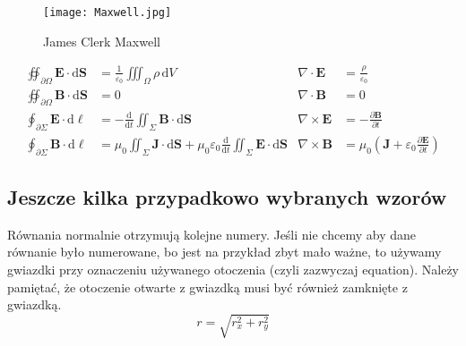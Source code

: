\begin{figure}[!t]
	\centering \texttt{[image: Maxwell.jpg]}
	\caption{James Clerk Maxwell}
	\label{rys:maxwell}
\end{figure}

\begin{align}
	\oiint\nolimits_{\partial \Omega} \pmb{E} \cdot \mathrm{d}\pmb{S}          & = \frac{1}{\varepsilon_0} \iiint\nolimits_\Omega \rho \, \mathrm{d}V                                                                                                         & \nabla \cdot \pmb{E}  & = \frac {\rho} {\varepsilon_0} \label{eq:maxwell1}                                                    \\
	\oiint\nolimits_{\partial \Omega} \pmb{B} \cdot \mathrm{d}\pmb{S}          & = 0                                                                                                                                                                          & \nabla \cdot \pmb{B}  & = 0 \label{eq:maxwell2}                                                                               \\
	\oint\nolimits_{\partial \Sigma} \pmb{E} \cdot \mathrm{d}\boldsymbol{\ell} & = -\frac{\mathrm{d}}{\mathrm{d}t}\iint\nolimits_{\Sigma}\pmb{B}\cdot\mathrm{d}\pmb{S}                                                                                        & \nabla \times \pmb{E} & = -\frac{\partial \pmb{B}}{\partial t} \label{eq:maxwell3}                                            \\
	\oint\nolimits_{\partial \Sigma} \pmb{B} \cdot \mathrm{d}\boldsymbol{\ell} & = \mu_0 \iint\nolimits_{\Sigma} \pmb{J} \cdot \mathrm{d}\pmb{S} + \mu_0 \varepsilon_0 \frac{\mathrm{d}}{\mathrm{d}t} \iint\nolimits_{\Sigma} \pmb{E} \cdot \mathrm{d}\pmb{S} & \nabla \times \pmb{B} & = \mu_0\left(\pmb{J} + \varepsilon_0 \frac{\partial \pmb{E}} {\partial t} \right) \label{eq:maxwell4}
\end{align}


\subsection{Jeszcze kilka przypadkowo wybranych wzorów}
Równania normalnie otrzymują kolejne numery. Jeśli nie chcemy aby dane równanie było numerowane, bo jest na przykład zbyt mało ważne, to używamy gwiazdki przy oznaczeniu używanego otoczenia (czyli zazwyczaj equation). Należy pamiętać, że otoczenie otwarte z gwiazdką musi być również zamknięte z gwiazdką.
\begin{equation*}
	r = \sqrt{r_x^2 + r_y^2}
\end{equation*}


